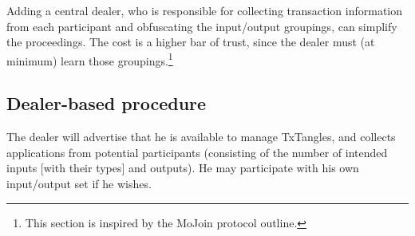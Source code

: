 Adding a central dealer, who is responsible for collecting transaction information from each participant and obfuscating the input/output groupings, can simplify the proceedings. The cost is a higher bar of trust, since the dealer must (at minimum) learn those groupings.\footnote{This section is inspired by the MoJoin protocol outline.}


\subsection{Dealer-based procedure}
\label{subsec:dealer-procedure-txtangle}

The dealer will advertise that he is available to manage TxTangles, and collects applications from potential participants (consisting of the number of intended inputs [with their types] and outputs). He may participate with his own input/output set if he wishes.

